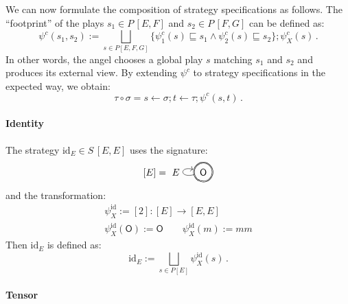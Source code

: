 \documentclass[sigplan,screen]{acmart}
\newcommand{\kw}[1]{\ensuremath{ \mathsf{#1} }}
\begin{document}
We can now formulate the composition of strategy specifications as follows.
The ``footprint'' of the plays $s_1 \in P \, [E,F]$ and $s_2 \in P \, [F,G]$
can be defined as:
\[
  \psi^c(s_1, s_2) :=
    \bigsqcup_{s \in P [E,F,G]}
    \{ \psi^c_1(s) \sqsubseteq s_1 \wedge \psi^c_2(s) \sqsubseteq s_2 \} ;
    \psi^c_X(s) \,.
\]
In other words,
the angel chooses a global play $s$
matching $s_1$ and $s_2$
and produces its external view.
By extending $\psi^c$ to strategy specifications
in the expected way, we obtain:
\[
  \tau \circ \sigma = 
    s \leftarrow \sigma ;
    t \leftarrow \tau ;
    \psi^c(s, t) \,.
\]


\paragraph{Identity} %

The strategy $\mathrm{id}_E \in S \, [E,E]$
uses the signature:
\[
  [E] =
  \begin{tikzpicture}[baseline=(O.base)]
    \node[circle,draw,double] (O) at (0,0) {$\kw{O}$};
    \path[->] (O) edge[loop left] node[auto] {$E$} (O);
  \end{tikzpicture}
\]
and the transformation:
\begin{gather*}
  \psi^\mathrm{id}_X := [2] : [E] \rightarrow [E,E] \\
  \psi^\mathrm{id}_X(\kw{O}) := \kw{O} \qquad
  \psi^\mathrm{id}_X(m) := mm
\end{gather*}
Then $\mathrm{id}_E$ is defined as:
\[
  \mathrm{id}_E :=
    \bigsqcup_{s \in P [E]} \psi^\mathrm{id}_X(s) \,.
\]


\paragraph{Tensor} %
\end{document}
